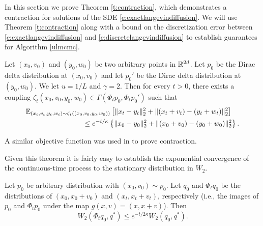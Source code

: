 \label{s:exactconvergence}
In this section we prove Theorem \ref{t:contraction}, which demonstrates a contraction for solutions of the SDE \eqref{e:exactlangevindiffusion}. We will use Theorem \ref{t:contraction} along with a bound on the discretization error between \eqref{e:exactlangevindiffusion} and \eqref{e:discretelangevindiffusion} to establish guarantees for Algorithm \ref{ulmcmc}.

\begin{theorem}\label{t:contraction}
Let $(x_0,v_0)$ and $(y_0,w_0)$ be two arbitrary points in $\mathbb{R}^{2d}$.
Let $p_0$ be the Dirac delta distribution at $(x_0,v_0)$ and let $p_0'$ be the Dirac delta distribution at $(y_0,w_0)$. We let $u = 1/L$ and $\gamma = 2$. Then for every $t>0$, there exists a coupling $\zeta_t(x_0,v_0,y_0,w_0) \in \Gamma(\Phi_t p_0,\Phi_t p_0')$ such that 
\begin{align}\label{e:conttimeconv}
& \mathbb{E}_{(x_t,v_t,y_t,w_t) \sim \zeta_t((x_0,v_0,y_0,w_0))}\left[\|x_t - y_t\|_2^2 + \|(x_t+v_t)-(y_t+w_t)\|_2^2\right] \\
\nonumber &\qquad \qquad \qquad \qquad \leq e^{-t/\kappa}\left\{\|x_0 - y_0\|_2^2 + \|(x_0+v_0)-(y_0+w_0)\|_2^2\right\}.
\end{align}  
\end{theorem}
\begin{remark}
A similar objective function was used in \cite{eberle2017couplings} to prove contraction.
\end{remark}
Given this theorem it is fairly easy to establish the exponential convergence of the continuous-time process to the stationary distribution in $W_2$.
\begin{corollary}\label{c:exactconvergence}
Let $p_0$ be arbitrary distribution with $(x_0,v_0) \sim p_0$.  Let $q_0$ and $\Phi_t q_0$ be the distributions of  $(x_0,x_0 + v_0)$ and $(x_t,x_t+v_t)$, respectively (i.e., the images of $p_0$ and $\Phi_t p_0$ under the map $g(x,v) = (x,x+v)$). Then
$$W_2(\Phi_t q_0,q^*) \leq e^{- t/2\kappa} W_2(q_0,q^*).$$
\end{corollary}
